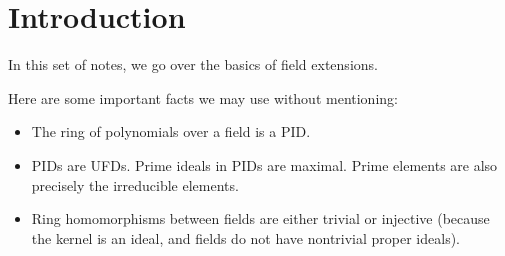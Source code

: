 \section{Introduction}
In this set of notes, we go over the basics of field extensions.

Here are some important facts we may use without mentioning:
\begin{itemize}
    \item The ring of polynomials over a field is a PID.
    \item PIDs are UFDs. Prime ideals in PIDs are maximal. Prime elements are also precisely the irreducible elements.
    \item Ring homomorphisms between fields are either trivial or injective (because the kernel is an ideal, and fields do not have nontrivial proper ideals).
\end{itemize}
